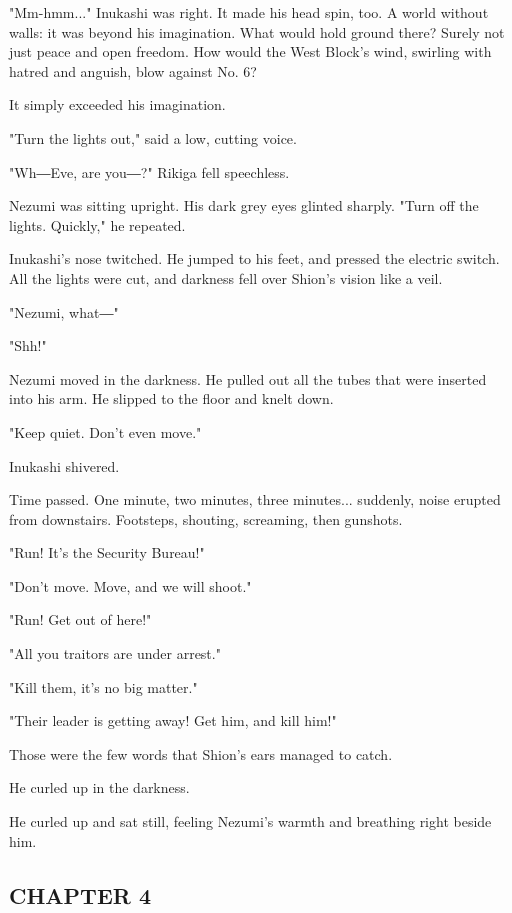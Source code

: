 "Mm-hmm..." Inukashi was right. It made his head spin, too. A world
without walls: it was beyond his imagination. What would hold ground
there? Surely not just peace and open freedom. How would the West
Block's wind, swirling with hatred and anguish, blow against No. 6?

It simply exceeded his imagination.

"Turn the lights out," said a low, cutting voice.

"Wh―Eve, are you―?" Rikiga fell speechless.

Nezumi was sitting upright. His dark grey eyes glinted sharply. "Turn
off the lights. Quickly," he repeated.

Inukashi's nose twitched. He jumped to his feet, and pressed the
electric switch. All the lights were cut, and darkness fell over Shion's
vision like a veil.

"Nezumi, what―"

"Shh!"

Nezumi moved in the darkness. He pulled out all the tubes that were
inserted into his arm. He slipped to the floor and knelt down.

"Keep quiet. Don't even move."

Inukashi shivered.

Time passed. One minute, two minutes, three minutes... suddenly, noise
erupted from downstairs. Footsteps, shouting, screaming, then gunshots.

"Run! It's the Security Bureau!"

"Don't move. Move, and we will shoot."

"Run! Get out of here!"

"All you traitors are under arrest."

"Kill them, it's no big matter."

"Their leader is getting away! Get him, and kill him!"

Those were the few words that Shion's ears managed to catch.

He curled up in the darkness.

He curled up and sat still, feeling Nezumi's warmth and breathing right
beside him.

\hypertarget{index_split_003.htmlux5cux23calibre_pb_6}{}

\protect\hypertarget{index_split_004.html}{}{}

\hypertarget{index_split_004.htmlux5cux23calibre_pb_0}{}

\hypertarget{index_split_004.htmlux5cux23calibre_toc_5}{%
\subsection{CHAPTER 4}\label{index_split_004.htmlux5cux23calibre_toc_5}}


